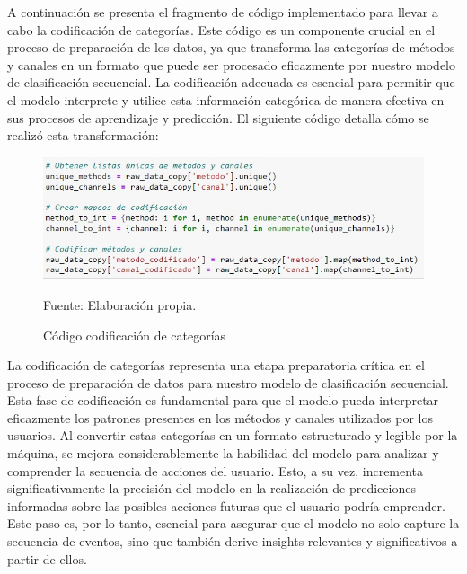 A continuación se presenta el fragmento de código implementado para llevar a cabo la codificación de categorías. Este código es un componente crucial en el proceso de preparación de los datos, ya que transforma las categorías de métodos y canales en un formato que puede ser procesado eficazmente por nuestro modelo de clasificación secuencial. La codificación adecuada es esencial para permitir que el modelo interprete y utilice esta información categórica de manera efectiva en sus procesos de aprendizaje y predicción. El siguiente código detalla cómo se realizó esta transformación:

\begin{figure}[H]
    \begin{minipage}[t]{0.9\textwidth}
        \caption{Código codificación de categorías}
        \label{codificación_categorias}        
    \end{minipage}

    \vspace{10pt}

    \begin{minipage}[b]{1\textwidth}
        \centering
        \includegraphics[width=\textwidth]{img/Código codificación categorias.jpg}        
    \end{minipage}

    \begin{minipage}[t]{0.9\textwidth}
        Fuente: Elaboración propia.
    \end{minipage}
\end{figure}

La codificación de categorías representa una etapa preparatoria crítica en el proceso de preparación de datos para nuestro modelo de clasificación secuencial. Esta fase de codificación es fundamental para que el modelo pueda interpretar eficazmente los patrones presentes en los métodos y canales utilizados por los usuarios. Al convertir estas categorías en un formato estructurado y legible por la máquina, se mejora considerablemente la habilidad del modelo para analizar y comprender la secuencia de acciones del usuario. Esto, a su vez, incrementa significativamente la precisión del modelo en la realización de predicciones informadas sobre las posibles acciones futuras que el usuario podría emprender. Este paso es, por lo tanto, esencial para asegurar que el modelo no solo capture la secuencia de eventos, sino que también derive insights relevantes y significativos a partir de ellos.


